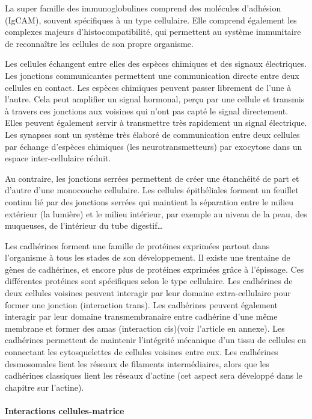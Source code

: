 La super famille des immunoglobulines comprend des molécules d'adhésion (IgCAM), souvent spécifiques à un type cellulaire. Elle comprend également les complexes majeurs d'histocompatibilité, qui permettent au système immunitaire de reconnaître les cellules de son propre organisme. 

Les cellules échangent entre elles des espèces chimiques et des signaux électriques. 
Les jonctions communicantes permettent une communication directe entre deux cellules en contact. Les espèces chimiques peuvent passer librement de l'une à l'autre. Cela peut amplifier un signal hormonal, perçu par une cellule et transmis à travers ces jonctions aux voisines qui n'ont pas capté le signal directement. Elles peuvent également servir à transmettre très rapidement un signal électrique. 
Les synapses sont un système très élaboré de communication entre deux cellules par échange d'espèces chimiques (les neurotransmetteurs) par exocytose dans un espace inter-cellulaire réduit. 

Au contraire, les jonctions serrées permettent de créer une étanchéité de part et d'autre d'une monocouche cellulaire. Les cellules épithéliales forment un feuillet continu lié par des jonctions serrées qui maintient la séparation entre le milieu extérieur (la lumière) et le milieu intérieur, par exemple au niveau de la peau, des muqueuses, de l'intérieur du tube digestif\dots

Les cadhérines forment une famille de protéines exprimées partout dans l'organisme à tous les stades de son développement. 
Il existe une trentaine de gènes de cadhérines, et encore plus de protéines exprimées grâce à l'épissage. Ces différentes protéines sont spécifiques selon le type cellulaire.
Les cadhérines de deux cellules voisines peuvent interagir par leur domaine extra-cellulaire pour former une jonction (interaction trans). Les cadhérines peuvent également interagir par leur domaine transmembranaire entre cadhérine d'une même membrane et former des amas (interaction cis)(voir l'article en annexe). 
Les cadhérines permettent de maintenir l'intégrité mécanique d'un tissu de cellules en connectant les cytosquelettes de cellules voisines entre eux. Les cadhérines desmosomales lient les réseaux de filaments intermédiaires, alors que les cadhérines classiques lient les réseaux d'actine (cet aspect sera développé dans le chapitre sur l'actine). 


\paragraph{Interactions cellules-matrice}

